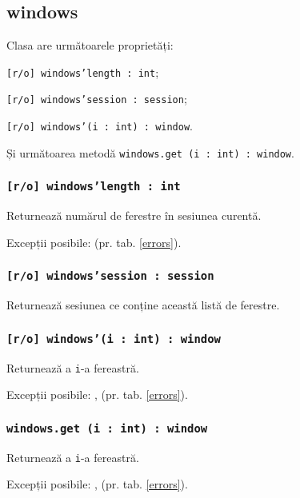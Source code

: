 \subsection{windows}

Clasa \windows{} are următoarele proprietăți:
\begin{icItems}
	\item \texttt{[r/o] windows'length : int};
	\item \texttt{[r/o] windows'session : session};
	\item \texttt{[r/o] windows'(i : int) : window}.
\end{icItems}

Și următoarea metodă \texttt{windows.get (i : int) : window}.

\subsubsection{\texttt{[r/o] windows'length : int}}

Returnează numărul de ferestre în sesiunea curentă.

Excepții posibile:  (pr. tab. \ref{errors}).

\subsubsection{\texttt{[r/o] windows'session : session}}

Returnează sesiunea ce conține această listă de ferestre.

\subsubsection{\texttt{[r/o] windows'(i : int) : window}}

Returnează a \texttt{i}-a fereastră.

Excepții posibile: ,  (pr. tab. \ref{errors}).

\subsubsection{\texttt{windows.get (i : int) : window}}

Returnează a \texttt{i}-a fereastră.

Excepții posibile: ,  (pr. tab. \ref{errors}).

